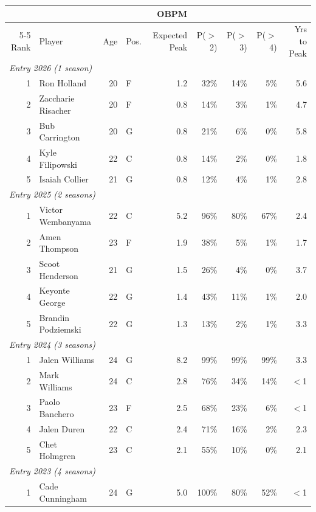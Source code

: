 \begin{table}[htbp]
  \centering\small
  \begin{tabular}{rlrlrrrrr}
    \toprule
     & & & & OBPM & & & & \\
    \cmidrule(lr){5-5}
    Rank & Player & Age & Pos. & Expected Peak & P($>$2) & P($>$3) & P($>$4) & Yrs to Peak \\
    \midrule
    \multicolumn{9}{l}{\textit{Entry 2026 (1 season)}} \\
    \midrule
    1 & Ron Holland & 20 & F & 1.2 & 32\% & 14\% & 5\% & 5.6 \\
    2 & Zaccharie Risacher & 20 & F & 0.8 & 14\% & 3\% & 1\% & 4.7 \\
    3 & Bub Carrington & 20 & G & 0.8 & 21\% & 6\% & 0\% & 5.8 \\
    4 & Kyle Filipowski & 22 & C & 0.8 & 14\% & 2\% & 0\% & 1.8 \\
    5 & Isaiah Collier & 21 & G & 0.8 & 12\% & 4\% & 1\% & 2.8 \\
    \midrule[0.4pt]
    \multicolumn{9}{l}{\textit{Entry 2025 (2 seasons)}} \\
    \midrule
    1 & Victor Wembanyama & 22 & C & 5.2 & 96\% & 80\% & 67\% & 2.4 \\
    2 & Amen Thompson & 23 & F & 1.9 & 38\% & 5\% & 1\% & 1.7 \\
    3 & Scoot Henderson & 21 & G & 1.5 & 26\% & 4\% & 0\% & 3.7 \\
    4 & Keyonte George & 22 & G & 1.4 & 43\% & 11\% & 1\% & 2.0 \\
    5 & Brandin Podziemski & 22 & G & 1.3 & 13\% & 2\% & 1\% & 3.3 \\
    \midrule[0.4pt]
    \multicolumn{9}{l}{\textit{Entry 2024 (3 seasons)}} \\
    \midrule
    1 & Jalen Williams & 24 & G & 8.2 & 99\% & 99\% & 99\% & 3.3 \\
    2 & Mark Williams & 24 & C & 2.8 & 76\% & 34\% & 14\% & $<$1 \\
    3 & Paolo Banchero & 23 & F & 2.5 & 68\% & 23\% & 6\% & $<$1 \\
    4 & Jalen Duren & 22 & C & 2.4 & 71\% & 16\% & 2\% & 2.3 \\
    5 & Chet Holmgren & 23 & C & 2.1 & 55\% & 10\% & 0\% & 2.1 \\
    \midrule[0.4pt]
    \multicolumn{9}{l}{\textit{Entry 2023 (4 seasons)}} \\
    \midrule
    1 & Cade Cunningham & 24 & G & 5.0 & 100\% & 80\% & 52\% & $<$1 \\

\end{tabular}
\end{table}
